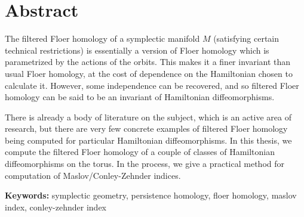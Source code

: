 
\section*{Abstract}


The filtered Floer homology of a symplectic manifold $M$ (satisfying certain technical restrictions) is essentially a version of Floer homology which is parametrized by the actions of the orbits. This makes it a finer invariant than usual Floer homology, at the cost of dependence on the Hamiltonian chosen to calculate it. However, some independence can be recovered, and so filtered Floer homology can be said to be an invariant of Hamiltonian diffeomorphisms.

There is already a body of literature on the subject, which is an active area of research, but there are very few concrete examples of filtered Floer homology being computed for particular Hamiltonian diffeomorphisms. In this thesis, we compute the filtered Floer homology of a couple of classes of Hamiltonian diffeomorphisms on the torus. In the process, we give a practical method for computation of Maslov/Conley-Zehnder indices.

\vfill

\textbf{\Large Keywords:} symplectic geometry, persistence homology, floer homology, maslov index, conley-zehnder index

